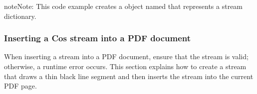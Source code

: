 \documentclass[letterpaper,12pt,english,openany,oneside]{sphinxmanual}
\begin{document}
\begin{sphinxVerbatim}[commandchars=\\\{\}]
      
      
   
\end{sphinxVerbatim}

\begin{sphinxadmonition}{note}{Note:}
This code example creates a  object named  that represents a stream dictionary.
\end{sphinxadmonition}


\subsubsection{Inserting a Cos stream into a PDF document}
\label{\detokenize{Plugins_Cos:inserting-a-cos-stream-into-a-pdf-document}}
When inserting a stream into a PDF document, ensure that the stream is valid; otherwise, a run\sphinxhyphen{}time error occurs. This section explains how to create a stream that draws a thin black line segment and then inserts the stream into the current PDF page.
\end{document}
